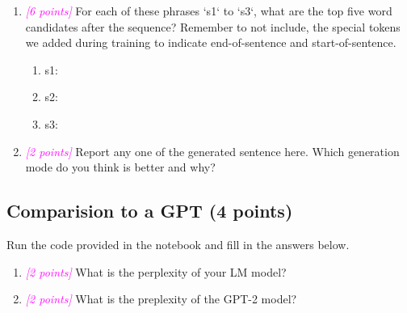 \documentclass{exam}
\newcommand{\grade}[1]{\small\textcolor{magenta}{\emph{[#1 points]}} \normalsize}
\begin{document}
\begin{enumerate}
    \item \grade{6} For each of these phrases `s1` to `s3`, what are the top five word candidates after the sequence? Remember to not include, the special tokens we added during training to indicate end-of-sentence and start-of-sentence.
    \begin{enumerate}
        \item s1: %
        \item s2: %
        \item s3: %
        
    \end{enumerate}
    
    \item \grade{2} Report any one of the generated sentence here. Which generation mode do you think is better and why?
    \vspace{3cm}
\end{enumerate}
\subsection{Comparision to a GPT (4 points)}
Run the code provided in the notebook and fill in the answers below.

\begin{enumerate}
    \item \grade{2} What is the perplexity of your LM model?
    
    \vspace{5cm}
    \item \grade{2} What is the preplexity of the GPT-2 model?
    
\end{enumerate}
\end{document}
